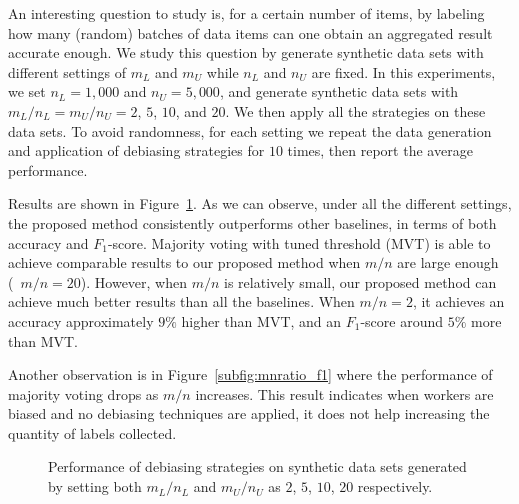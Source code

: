 An interesting question to study is, 
for a certain number of items, by labeling how many (random) batches of data items can one obtain an aggregated result accurate enough.
We study this question by generate synthetic data sets 
with different settings of $m_L$ and $m_U$ while $n_L$ and $n_U$ are fixed.  
In this experiments, we set $n_L=1,000$ and $n_U=5,000$, 
and generate synthetic data sets with $m_L/n_L=m_U/n_U=2$, $5$, $10$, and $20$.  
We then apply all the strategies on these data sets.  
To avoid randomness, for each setting we repeat the data generation and application of debiasing strategies for $10$ times, 
then report the average performance.  

Results are shown in Figure~\ref{fig:mnratio}.  
As we can observe, under all the different settings, 
the proposed method consistently outperforms other baselines, 
in terms of both accuracy and $F_1$-score. 
Majority voting with tuned threshold (MVT) 
is able to achieve comparable results to our proposed method 
when $m/n$ are large enough (\eg~$m/n=20$).
However, when $m/n$ is relatively small, 
our proposed method can achieve much better results than all the baselines.  
When $m/n=2$, it achieves an accuracy approximately $9\%$ higher than MVT, 
and an $F_1$-score around $5\%$ more than MVT.  

Another observation is in Figure~\ref{subfig:mnratio_f1}
where the performance of majority voting drops as $m/n$ increases. 
This result indicates when workers are biased and no debiasing techniques are applied, 
it does not help increasing the quantity of labels collected. 

\begin{figure}[!t]
  \centering
  \caption{\label{fig:mnratio}
  Performance of debiasing strategies on synthetic data sets 
  generated by setting both $m_L/n_L$ and $m_U/n_U$ as $2$, $5$, $10$, $20$ respectively.
  }
\end{figure}

